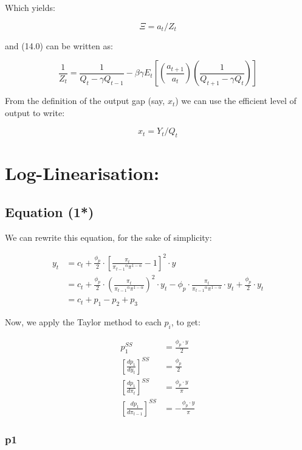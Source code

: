 \documentclass[11pt,preprint, authoryear]{elsarticle}
\numberwithin{equation}{section}
\numberwithin{figure}{section}
\numberwithin{table}{section}
\begin{document}
Which yields:

\[\Xi = a_t/Z_t\]

and (14.0) can be written as:

\[\frac{1}{Z_{t}}=\frac{1}{Q_{t}-\gamma Q_{t-1}}-\beta \gamma E_{t}\left[\left(\frac{a_{t+1}}{a_{t}}\right)\left(\frac{1}{Q_{t+1}-\gamma Q_{t}}\right)\right] \tag{14}\]

From the definition of the output gap (say, \(x_t\)) we can use the
efficient level of output to write:

\[x_t = Y_t/Q_t \tag{15}\]

\newpage

\hypertarget{log-linearisation}{%
\section{Log-Linearisation:}\label{log-linearisation}}

\hypertarget{equation-1}{%
\subsection{Equation (1*)}\label{equation-1}}

We can rewrite this equation, for the sake of simplicity:

\[\begin{aligned}
y_{t} &= c_t + \frac{\phi_{p}}{2} \cdot \left[ \frac{\pi_{t}}{{\pi_{t-1}}^{\alpha} \pi^{1-\alpha}} -1 \right]^{2} \cdot y\\
&=c_{t} + \frac{\phi_{p}}{2} \cdot \left(\frac{\pi_{t}}{{\pi_{t-1}}^{\alpha} \pi^{1-\alpha}} \right)^2 \cdot y_{t} - \phi_{p} \cdot
\frac{\pi_{t}}{{\pi_{t-1}}^{\alpha} \pi^{1-\alpha}} \cdot y_{t} + \frac{\phi_{p}}{2} \cdot y_{t}\\
&= c_t + p_{1} - p_{2} + p_{3}
\end{aligned}\]

Now, we apply the Taylor method to each \(p_{i}\), to get:

\[\begin{aligned}
p_{1}^{SS}&=\frac{\phi_{p} \cdot y}{2}\\\left[\frac{dp_{1}}{dy_{t}} \right]^{SS} &= \frac{\phi_{p}}{2}\\\left[\frac{dp_{1}}{d\pi_{t}} \right]^{SS} &= \frac{\phi_{p} \cdot y}{\pi}\\\left[\frac{dp_{1}}{d\pi_{t-1}} \right]^{SS} &= - \frac{\phi_{p} \cdot y}{\pi}
\end{aligned}\]

\hypertarget{p1}{%
\subsubsection{p1}\label{p1}}
\end{document}
